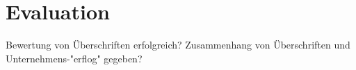 \chapter{Evaluation}

Bewertung von Überschriften erfolgreich?
Zusammenhang von Überschriften und Unternehmens-"erflog" gegeben?